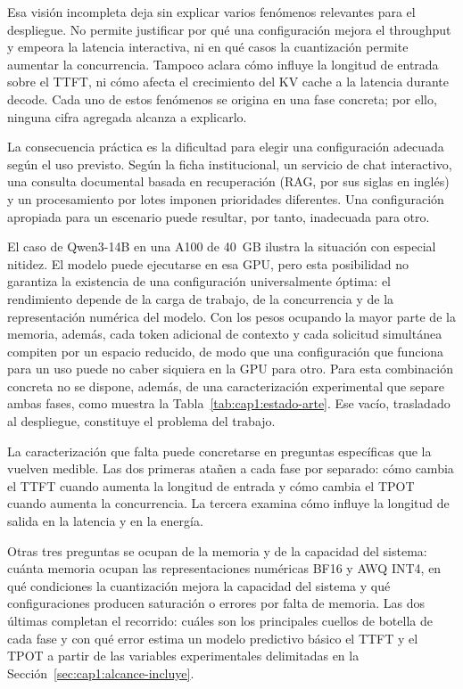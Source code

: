 Esa visión incompleta deja sin explicar varios fenómenos relevantes para el despliegue. No permite justificar por qué una configuración mejora el throughput y empeora la latencia interactiva, ni en qué casos la cuantización permite aumentar la concurrencia. Tampoco aclara cómo influye la longitud de entrada sobre el TTFT, ni cómo afecta el crecimiento del KV cache a la latencia durante decode. Cada uno de estos fenómenos se origina en una fase concreta; por ello, ninguna cifra agregada alcanza a explicarlo.

La consecuencia práctica es la dificultad para elegir una configuración adecuada según el uso previsto. Según la ficha institucional, un servicio de chat interactivo, una consulta documental basada en recuperación (RAG, por sus siglas en inglés) y un procesamiento por lotes imponen prioridades diferentes. Una configuración apropiada para un escenario puede resultar, por tanto, inadecuada para otro.

El caso de Qwen3-14B en una A100 de 40~GB ilustra la situación con especial nitidez. El modelo puede ejecutarse en esa GPU, pero esta posibilidad no garantiza la existencia de una configuración universalmente óptima: el rendimiento depende de la carga de trabajo, de la concurrencia y de la representación numérica del modelo. Con los pesos ocupando la mayor parte de la memoria, además, cada token adicional de contexto y cada solicitud simultánea compiten por un espacio reducido, de modo que una configuración que funciona para un uso puede no caber siquiera en la GPU para otro. Para esta combinación concreta no se dispone, además, de una caracterización experimental que separe ambas fases, como muestra la Tabla~\ref{tab:cap1:estado-arte}. Ese vacío, trasladado al despliegue, constituye el problema del trabajo.

La caracterización que falta puede concretarse en preguntas específicas que la vuelven medible. Las dos primeras atañen a cada fase por separado: cómo cambia el TTFT cuando aumenta la longitud de entrada y cómo cambia el TPOT cuando aumenta la concurrencia. La tercera examina cómo influye la longitud de salida en la latencia y en la energía.

Otras tres preguntas se ocupan de la memoria y de la capacidad del sistema: cuánta memoria ocupan las representaciones numéricas BF16 y AWQ INT4, en qué condiciones la cuantización mejora la capacidad del sistema y qué configuraciones producen saturación o errores por falta de memoria. Las dos últimas completan el recorrido: cuáles son los principales cuellos de botella de cada fase y con qué error estima un modelo predictivo básico el TTFT y el TPOT a partir de las variables experimentales delimitadas en la Sección~\ref{sec:cap1:alcance-incluye}.

